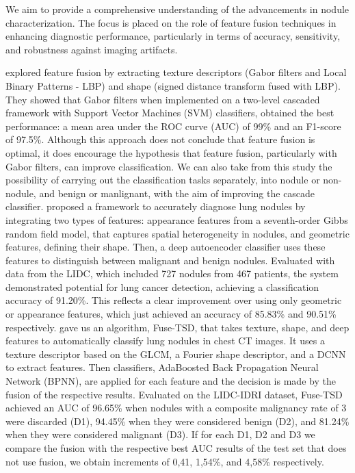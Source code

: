 We aim to provide a comprehensive understanding of the advancements in nodule characterization. The focus is placed on the role of feature fusion techniques in enhancing diagnostic performance, particularly in terms of accuracy, sensitivity, and robustness against imaging artifacts.


\citet{Farag2017} explored feature fusion by extracting texture descriptors (Gabor filters and Local Binary Patterns - LBP) and shape (signed distance transform fused with LBP). They showed that Gabor filters when implemented on a two-level cascaded framework with Support Vector Machines (SVM) classifiers, obtained the best performance: a mean area under the ROC curve (AUC) of 99\% and an F1-score of 97.5\%. Although this approach does not conclude that feature fusion is optimal, it does encourage the hypothesis that feature fusion, particularly with Gabor filters, can improve classification. We can also take from this study the possibility of carrying out the classification tasks separately, into nodule or non-nodule, and benign or manlignant, with the aim of improving the cascade classifier.
\citet{Shaffie2018} proposed a framework to accurately diagnose lung nodules by integrating two types of features: appearance features from a seventh-order Gibbs random field model, that captures spatial heterogeneity in nodules, and geometric features, defining their shape. Then, a deep autoencoder classifier uses these features to distinguish between malignant and benign nodules. Evaluated with data from the LIDC, which included 727 nodules from 467 patients, the system demonstrated potential for lung cancer detection, achieving a classification accuracy of 91.20\%. This reflects a clear improvement over using only geometric or appearance features, which just achieved an accuracy of 85.83\% and 90.51\% respectively.
\citet{Xie2018} gave us an algorithm, Fuse-TSD, that takes texture, shape, and deep features to automatically classify lung nodules in chest CT images. It uses a texture descriptor based on the GLCM, a Fourier shape descriptor, and a DCNN to extract features. Then classifiers, AdaBoosted Back Propagation Neural Network (BPNN), are applied for each feature and the decision is made by the fusion of the respective results. Evaluated on the LIDC-IDRI dataset, Fuse-TSD achieved an AUC of 96.65\% when nodules with a composite malignancy rate of 3 were discarded (D1), 94.45\% when they were considered benign (D2), and 81.24\% when they were considered malignant (D3). If for each D1, D2 and D3 we compare the fusion with the respective best AUC results of the test set that does not use fusion, we obtain increments of 0,41, 1,54\%, and 4,58\% respectively.
